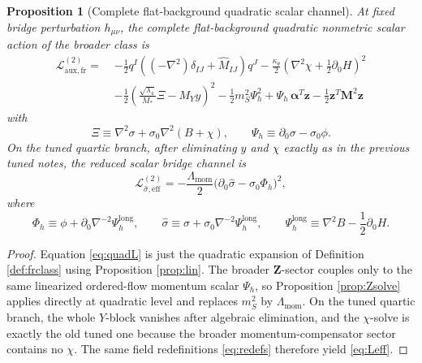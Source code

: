 \documentclass[11pt]{article}
\newtheorem{proposition}{Proposition}
\begin{document}
\begin{proposition}[Complete flat-background quadratic scalar channel]
\label{prop:quad}
At fixed bridge perturbation \(h_{\mu\nu}\), the complete flat-background quadratic nonmetric scalar action of the broader class is
\begin{align}
\mathcal L_{\mathrm{aux,fr}}^{(2)}
=\;&
-\frac12 q^I\!\left((-\nabla^2)\delta_{IJ}+\widehat M_{IJ}\right)\!q^J
-\frac{\kappa_\theta}{2}
\left(
\nabla^2\chi+\frac12\partial_0H
\right)^2
\nonumber\\
&-\frac12
\left(
\frac{\sqrt{\lambda_4}}{M_*}\Xi-M_Yy
\right)^2
-\frac12 m_S^2\Psi_h^2
+\Psi_h\,\bm\alpha^T\bm z
-\frac12\bm z^T\mathbf M^2\bm z
\label{eq:quadL}
\end{align}
with
\begin{equation}
\Xi\equiv \nabla^2\sigma+\sigma_0\nabla^2(B+\chi),
\qquad
\Psi_h\equiv \partial_0\sigma-\sigma_0\phi.
\label{eq:Xipsi}
\end{equation}
On the tuned quartic branch, after eliminating \(y\) and \(\chi\) exactly as in the previous tuned notes, the reduced scalar bridge channel is
\begin{equation}
\mathcal L_{\hat\sigma,\mathrm{eff}}^{(2)}
=
-\frac{\Lambda_{\mathrm{mom}}}{2}
\bigl(\partial_0\hat\sigma-\sigma_0\Phi_h\bigr)^2,
\label{eq:Leff}
\end{equation}
where
\begin{equation}
\Phi_h\equiv \phi+\partial_0\nabla^{-2}\Psi_{\!h}^{\mathrm{long}},
\qquad
\hat\sigma\equiv \sigma+\sigma_0\nabla^{-2}\Psi_{\!h}^{\mathrm{long}},
\qquad
\Psi_{\!h}^{\mathrm{long}}\equiv \nabla^2B-\frac12\partial_0H.
\label{eq:redefs}
\end{equation}
\end{proposition}

\begin{proof}
Equation \eqref{eq:quadL} is just the quadratic expansion of Definition \ref{def:frclass} using Proposition \ref{prop:lin}. The broader \(\bm Z\)-sector couples only to the same linearized ordered-flow momentum scalar \(\Psi_h\), so Proposition \ref{prop:Zsolve} applies directly at quadratic level and replaces \(m_S^2\) by \(\Lambda_{\mathrm{mom}}\). On the tuned quartic branch, the whole \(Y\)-block vanishes after algebraic elimination, and the \(\chi\)-solve is exactly the old tuned one because the broader momentum-compensator sector contains no \(\chi\). The same field redefinitions \eqref{eq:redefs} therefore yield \eqref{eq:Leff}.
\end{proof}
\end{document}
